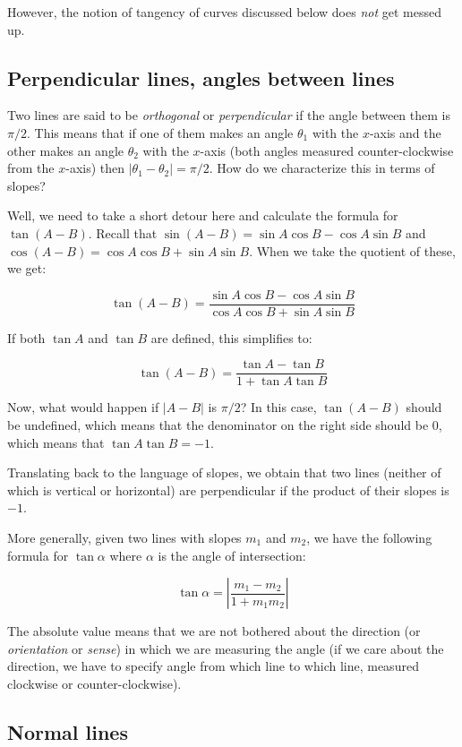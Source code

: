 \documentclass[10pt]{amsart}
\begin{document}
However, the notion of tangency of curves discussed below does {\em
not} get messed up.

\subsection{Perpendicular lines, angles between lines}

Two lines are said to be {\em orthogonal} or {\em perpendicular} if
the angle between them is $\pi/2$. This means that if one of them
makes an angle $\theta_1$ with the $x$-axis and the other makes an
angle $\theta_2$ with the $x$-axis (both angles measured
counter-clockwise from the $x$-axis) then $|\theta_1 - \theta_2| =
\pi/2$. How do we characterize this in terms of slopes?

Well, we need to take a short detour here and calculate the formula
for $\tan(A - B)$. Recall that $\sin(A - B) = \sin A \cos B - \cos A
\sin B$ and $\cos(A - B) = \cos A \cos B + \sin A \sin B$. When we
take the quotient of these, we get:

$$\tan(A - B) = \frac{\sin A \cos B - \cos A \sin B}{\cos A \cos B + \sin A \sin B}$$

If both $\tan A$ and $\tan B$ are defined, this simplifies to:

$$\tan(A - B) = \frac{\tan A - \tan B}{1 + \tan A \tan B}$$

Now, what would happen if $|A - B|$ is $\pi/2$? In this case, $\tan(A
- B)$ should be undefined, which means that the denominator on the
right side should be $0$, which means that $\tan A \tan B =
-1$. 

Translating back to the language of slopes, we obtain that two lines
(neither of which is vertical or horizontal) are perpendicular if the
product of their slopes is $-1$.

More generally, given two lines with slopes $m_1$ and $m_2$, we have
the following formula for $\tan \alpha$ where $\alpha$ is the angle of
intersection:

$$\tan \alpha = \left| \frac{m_1 - m_2}{1 + m_1m_2}\right|$$

The absolute value means that we are not bothered about the direction
(or {\em orientation} or {\em sense}) in which we are measuring the
angle (if we care about the direction, we have to specify angle from
which line to which line, measured clockwise or counter-clockwise).

\subsection{Normal lines}
\end{document}

